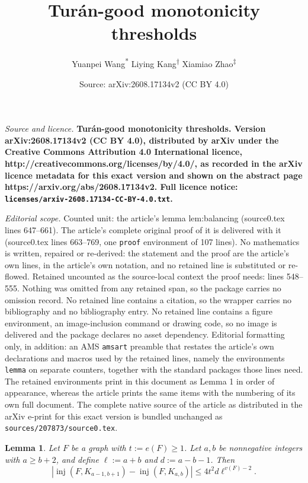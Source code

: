 \documentclass[10pt,a4paper]{amsart}
\title{\fontsize{20}{24}\selectfont \bfseries Tur\'an-good monotonicity thresholds}
\author{Yuanpei Wang\textsuperscript{*} \qquad Liying Kang\textsuperscript{\(\dagger\)} \qquad Xiamiao Zhao\textsuperscript{\(\ddagger\)}}
\date{Source: arXiv:2608.17134v2 (CC BY 4.0)}
\newtheorem{lemma}{Lemma}
\newcommand{\inj}{\operatorname{inj}}
\begin{document}
\maketitle

\noindent\emph{Source and licence.} \fontsize{20}{24}\selectfont \bfseries Tur\'an-good monotonicity thresholds. Version arXiv:2608.17134v2 (CC BY 4.0), distributed by arXiv under the Creative Commons Attribution 4.0 International licence, http://creativecommons.org/licenses/by/4.0/, as recorded in the arXiv licence metadata for this exact version and shown on the abstract page https://arxiv.org/abs/2608.17134v2. Full licence notice: \texttt{licenses/arxiv-2608.17134-CC-BY-4.0.txt}.\par\smallskip

\noindent\textit{Editorial scope.} Counted unit: the article's lemma lem:balancing (source0.tex lines 647--661). The article's complete original proof of it is delivered with it (source0.tex lines 663--769, one \texttt{proof} environment of 107 lines). No mathematics is written, repaired or re-derived: the statement and the proof are the article's own lines, in the article's own notation, and no retained line is substituted or re-flowed.  Retained uncounted as the source-local context the proof needs: lines 548--555.  Nothing was omitted from any retained span, so the package carries no omission record.  No retained line contains a citation, so the wrapper carries no bibliography and no bibliography entry.  No retained line contains a figure environment, an image-inclusion command or drawing code, so no image is delivered and the package declares no asset dependency.  Editorial formatting only, in addition: an AMS \texttt{amsart} preamble that restates the article's own declarations and macros used by the retained lines, namely the environments \texttt{lemma} on separate counters, together with the standard packages those lines need.  The retained environments print in this document as Lemma 1 in order of appearance, whereas the article prints the same items with the numbering of its own full document.  The complete native source of the article as distributed in the arXiv e-print for this exact version is bundled unchanged as \texttt{sources/207873/source0.tex}.
\begin{lemma}
\label{lem:two-part-finite-difference}
Let $F$ be a graph with $t:=e(F)\ge 1$. Let $a,b$ be nonnegative integers with $a\ge b+2$, and define $\ell:=a+b$ and $d:=a-b-1$. Then
\[
\left|\inj(F,K_{a-1,b+1})-\inj(F,K_{a,b})\right|
\le 4t^2d\ell^{v(F)-2}.
\]
\end{lemma}
\end{document}
